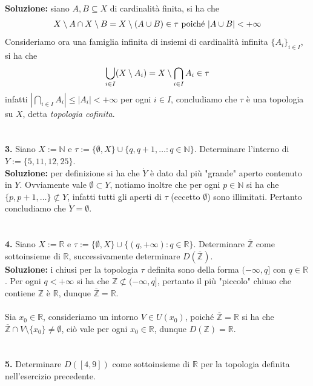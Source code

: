 \documentclass{article}
\begin{document}
\textbf{Soluzione:} siano $A, B \subseteq X$ di cardinalità finita, si ha che
\begin{gather}
    X \setminus A \cap X \setminus B = X \setminus (A \cup B) \in \tau \text{ poiché } |A \cup B| < +\infty \notag
\end{gather}Consideriamo ora una famiglia infinita di insiemi di cardinalità infinita $\{ A_i \}_{i \in I}$, si ha che
\begin{gather}
    \bigcup_{i \in I} (X \setminus A_i) = X \setminus \bigcap_{i \in I} A_i \in \tau \notag
\end{gather}
infatti $|\bigcap_{i \in I} A_i| \leq |A_i| < +\infty$ per ogni $i \in I$, concludiamo che $\tau$ è una topologia su $X$, detta \textit{topologia cofinita}. \\ \\ \\
\textbf{3.} Siano $X := \mathbb{N}$ e $\tau := \{ \emptyset, X \} \cup \{q, q+1, \dots : q \in \mathbb{N} \}$. Determinare l'interno di $Y := \{ 5, 11, 12, 25 \}$. \\

\textbf{Soluzione:} per definizione si ha che $\mathring{Y}$ è dato dal più "grande" aperto contenuto in $Y$. Ovviamente vale $\emptyset \subset Y$, notiamo inoltre che per ogni $p \in \mathbb{N}$ si ha che $\{ p, p+1, \dots \} \not\subset Y$, infatti tutti gli aperti di $\tau$ (eccetto $\emptyset$) sono illimitati. Pertanto concludiamo che $\mathring{Y} = \emptyset$. \\ \\ \\
\textbf{4.} Siano $X := \mathbb{R}$ e $\tau := \{ \emptyset, X \} \cup \{ (q, +\infty) : q \in \mathbb{R} \}$. Determinare $\overline{\mathbb{Z}}$ come sottoinsieme di $\mathbb{R}$, successivamente determinare $D(\mathbb{\overline{Z}})$. \\

\textbf{Soluzione:} i chiusi per la topologia $\tau$ definita sono della forma $(-\infty, q]$ con $q \in \mathbb{R}$. Per ogni $q < +\infty$ si ha che $\mathbb{Z} \not\subset (-\infty, q]$, pertanto il più "piccolo" chiuso che contiene $\mathbb{Z}$ è $\mathbb{R}$, dunque $\overline{\mathbb{Z}} = \mathbb{R}$. \\ \\
Sia $x_0 \in \mathbb{R}$, consideriamo un intorno $V \in U(x_0)$, poiché $\overline{\mathbb{Z}} = \mathbb{R}$ si ha che $\overline{\mathbb{Z}} \cap V \setminus \{ x_0 \} \neq \emptyset$, ciò vale per ogni $x_0 \in \mathbb{R}$, dunque $D(\mathbb{Z}) = \mathbb{R}$. \\ \\ \\
\textbf{5.} Determinare $D([4, 9])$ come sottoinsieme di $\mathbb{R}$ per la topologia definita nell'esercizio precedente. \\
\end{document}
